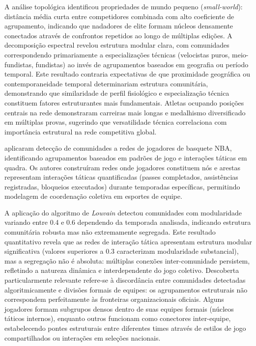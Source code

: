 A análise topológica identificou propriedades de mundo pequeno (\textit{small-world}): distância média curta entre competidores combinada com alto coeficiente de agrupamento, indicando que nadadores de elite formam núcleos densamente conectados através de confrontos repetidos ao longo de múltiplas edições. A decomposição espectral revelou estrutura modular clara, com comunidades correspondendo primariamente a especializações técnicas (velocistas puros, meio-fundistas, fundistas) ao invés de agrupamentos baseados em geografia ou período temporal. Este resultado contraria expectativas de que proximidade geográfica ou contemporaneidade temporal determinariam estrutura comunitária, demonstrando que similaridade de perfil fisiológico e especialização técnica constituem fatores estruturantes mais fundamentais. Atletas ocupando posições centrais na rede demonstraram carreiras mais longas e medalhismo diversificado em múltiplas provas, sugerindo que versatilidade técnica correlaciona com importância estrutural na rede competitiva global.

 aplicaram detecção de comunidades a redes de jogadores de basquete NBA, identificando agrupamentos baseados em padrões de jogo e interações táticas em quadra. Os autores construíram redes onde jogadores constituem nós e arestas representam interações táticas quantificadas (passes completados, assistências registradas, bloqueios executados) durante temporadas específicas, permitindo modelagem de coordenação coletiva em esportes de equipe.

A aplicação do algoritmo de \textit{Louvain}{} detectou comunidades com modularidade variando entre 0.4 e 0.6 dependendo da temporada analisada, indicando estrutura comunitária robusta mas não extremamente segregada. Este resultado quantitativo revela que as redes de interação tática apresentam estrutura modular significativa (valores superiores a 0.3 caracterizam modularidade substancial), mas a segregação não é absoluta: múltiplas conexões inter-comunidade persistem, refletindo a natureza dinâmica e interdependente do jogo coletivo. Descoberta particularmente relevante refere-se à discordância entre comunidades detectadas algoritmicamente e divisões formais de equipes: os agrupamentos estruturais não correspondem perfeitamente às fronteiras organizacionais oficiais. Alguns jogadores formam subgrupos densos dentro de suas equipes formais (núcleos táticos internos), enquanto outros funcionam como conectores inter-equipe, estabelecendo pontes estruturais entre diferentes times através de estilos de jogo compartilhados ou interações em seleções nacionais.

